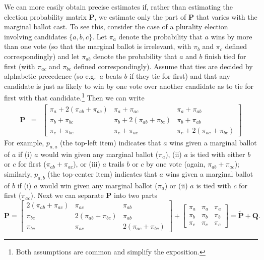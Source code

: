 \documentclass[11pt,a4paper]{article}
\begin{document}
We can more easily obtain precise estimates if, rather than estimating the election probability matrix $\mathbf{P}$, we estimate only the part of $\mathbf{P}$ that varies with the marginal ballot cast. To see this, consider the case of a plurality election involving candidates $\{a, b, c\}$. Let $\pi_a$ denote the probability that $a$ wins by more than one vote (so that the marginal ballot is irrelevant, with $\pi_b$ and $\pi_c$ defined correspondingly) and let $\pi_{ab}$ denote the probability that $a$ and $b$ finish tied for first (with $\pi_{ac}$ and $\pi_{bc}$ defined correspondingly). 
Assume that ties are decided by alphabetic precedence (so e.g.\ $a$ beats $b$ if they tie for first) and that any candidate is just as likely to win by one vote over another candidate as to tie for first with that candidate.\footnote{Both assumptions are common \citep[e.g.][]{bouton2013theory,fisher2017strategic} and simplify the exposition.} %
Then we can write 
\begin{eqnarray}
\mathbf{P} &=& \begin{bmatrix}
\pi_a + 2(\pi_{ab} + \pi_{ac}) & \pi_a + \pi_{ac}  & \pi_a + \pi_{ab} \\
\pi_b + \pi_{bc} & \pi_b + 2(\pi_{ab} + \pi_{bc}) &  \pi_b + \pi_{ab} \\
\pi_c + \pi_{bc} & \pi_c + \pi_{ac} & \pi_c + 2(\pi_{ac} + \pi_{bc})
\end{bmatrix}
\nonumber 
\end{eqnarray} 
For example, $p_{a,a}$ (the top-left item) indicates that $a$ wins given a marginal ballot of $a$ if (i) $a$ would win given any marginal ballot ($\pi_a$), (ii) $a$ is tied with either $b$ or $c$ for first ($\pi_{ab} + \pi_{ac}$), or (iii) $a$ trails $b$ or $c$ by one vote (again, $\pi_{ab} + \pi_{ac}$); similarly, $p_{a,b}$ (the top-center item) indicates that $a$ wins given a marginal ballot of $b$ if (i) $a$ would win given any marginal ballot ($\pi_a$) or (ii) $a$ is tied with $c$ for first ($\pi_{ac}$). Next we can separate $\mathbf{P}$ into two parts 
\[
\mathbf{P} =  \begin{bmatrix}   %
2(\pi_{ab} + \pi_{ac}) & \pi_{ac}  & \pi_{ab} \\
\pi_{bc} & 2(\pi_{ab} + \pi_{bc}) & \pi_{ab} \\
\pi_{bc} & \pi_{ac} & 2(\pi_{ac} + \pi_{bc})
\end{bmatrix}
+ 
\begin{bmatrix}
\pi_a & \pi_a  & \pi_a  \\
\pi_b & \pi_b  &  \pi_b  \\
\pi_c  & \pi_c & \pi_c 
\end{bmatrix} 
= \tilde{\mathbf{P}} + \mathbf{Q}.
\]
\end{document}
